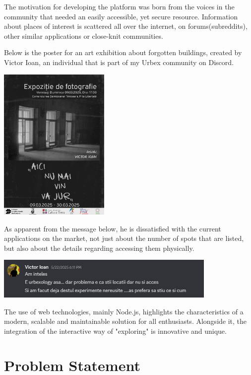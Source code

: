 \documentclass[12pt,a4paper]{report}
\begin{document}
The motivation for developing the platform was born from the voices in the community that needed an easily accessible, yet secure resource. Information about places of interest is scattered all over the internet, on forums(subreddits), other similar applications or close-knit communities.

Below is the poster for an art exhibition about forgotten buildings, created by Victor Ioan, an individual that is part of my Urbex community on Discord.

\begin{center}
\includegraphics[width=0.4\textwidth]{images/expozitie.jpg}
\end{center}

As apparent from the message below, he is dissatisfied with the current applications on the market, not just about the number of spots that are listed, but also about the details regarding accessing them physically.

\begin{center}
\includegraphics[width=0.8\textwidth]{images/mesaj.png}
\end{center}

The use of web technologies, mainly Node.js, highlights the characteristics of a modern, scalable and maintainable solution for all enthusiasts. Alongside it, the integration of the interactive way of "exploring" is innovative and unique.



\section*{Problem Statement}
\end{document}
